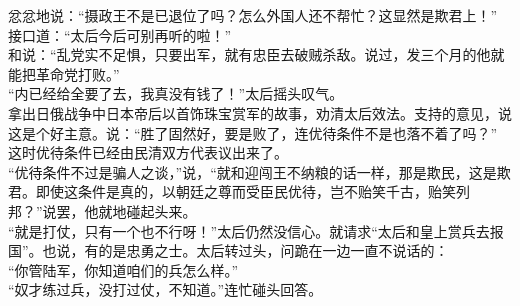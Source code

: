 忿忿地说：“摄政王不是已退位了吗？怎么外国人还不帮忙？这显然是欺君上！”\\

接口道：“太后今后可别再听的啦！”\\

和说：“乱党实不足惧，只要出军，就有忠臣去破贼杀敌。说过，发三个月的他就能把革命党打败。”\\

“内已经给全要了去，我真没有钱了！”太后摇头叹气。\\

拿出日俄战争中日本帝后以首饰珠宝赏军的故事，劝清太后效法。支持的意见，说这是个好主意。说：“胜了固然好，要是败了，连优待条件不是也落不着了吗？”\\

这时优待条件已经由民清双方代表议出来了。\\

“优待条件不过是骗人之谈，”说，“就和迎闯王不纳粮的话一样，那是欺民，这是欺君。即使这条件是真的，以朝廷之尊而受臣民优待，岂不贻笑千古，贻笑列邦？”说罢，他就地碰起头来。\\

“就是打仗，只有一个也不行呀！”太后仍然没信心。就请求“太后和皇上赏兵去报国”。也说，有的是忠勇之士。太后转过头，问跪在一边一直不说话的：\\

“你管陆军，你知道咱们的兵怎么样。”\\

“奴才练过兵，没打过仗，不知道。”连忙碰头回答。\\

